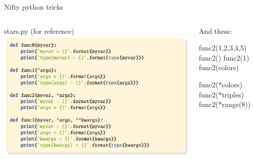 \documentclass[aspectratio=149, handout] {beamer}
\begin{document}
\begin{frame}[fragile,t]{ Nifty python tricks}

  \begin{columns}
    \begin{column}[t]{.48\textwidth}
      stars.py (for reference)
      \includegraphics[scale=.85, trim= 0 0 7cm 0, clip]{stars.pdf}
    \end{column}
   
    \begin{column}[t]{.48\textwidth}
      And these:
      \begin{pythoncode}
        func2(1,2,3,4,5)
        func2()
        func2(1)
        func2(colors)
      \end{pythoncode}
  
      \pause
      \begin{pythoncode}
        func2(*colors)
        func2(*triples)
        func2(*range(8))
      \end{pythoncode}
    \end{column}
  \end{columns}

\end{frame}
\end{document}
